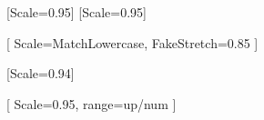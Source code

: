 \usepackage{metalogo}

\newcommand{\usedtexengine}{%
	\ifLuaTeX
	\LuaLaTeX
	\else
	\ifXeTeX
	\XeLaTeX
	\else
	\TeX
	\fi
	\fi
}



\usepackage{fontspec}

\setmainfont{Helvetica}[Scale=0.95]
\setsansfont{Helvetica}[Scale=0.95]

\setmonofont{IBM Plex Mono}[
Scale=MatchLowercase,
FakeStretch=0.85
]

\usepackage{unicode-math}
[Scale=0.94]

[
Scale=0.95,
range=up/{num}
]

\usepackage{microtype}



\usepackage{xcolor}
\usepackage{graphicx}

\usepackage{blindtext}
\usepackage{mwe}



%



\usepackage{caption}


